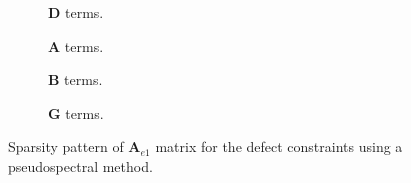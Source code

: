 \begin{figure}[ht]

\centering

\begin{subfigure}{0.33\textwidth}
\centering
\begin{minipage}{\textwidth}

\end{minipage}
\caption{$\bm{D}$ terms.}
\end{subfigure}%
\begin{subfigure}{0.33\textwidth}
\centering
\begin{minipage}{\textwidth}

\end{minipage}
\caption{$\bm{A}$ terms.}
\end{subfigure}%
\begin{subfigure}{0.33\textwidth}
\centering
\begin{minipage}{\textwidth}

\end{minipage}
\caption{$\bm{B}$ terms.}
\end{subfigure}%

\begin{subfigure}{0.33\textwidth}
\centering
\begin{minipage}{\textwidth}

\end{minipage}
\caption{$\bm{G}$ terms.}
\end{subfigure}%

\caption{Sparsity pattern of $\mathbf{A}_{e1}$ matrix for the defect constraints using a pseudospectral method.}
\label{fig:figsparsityAPS}
\end{figure}




% 	
% 	
% 	

% 	

